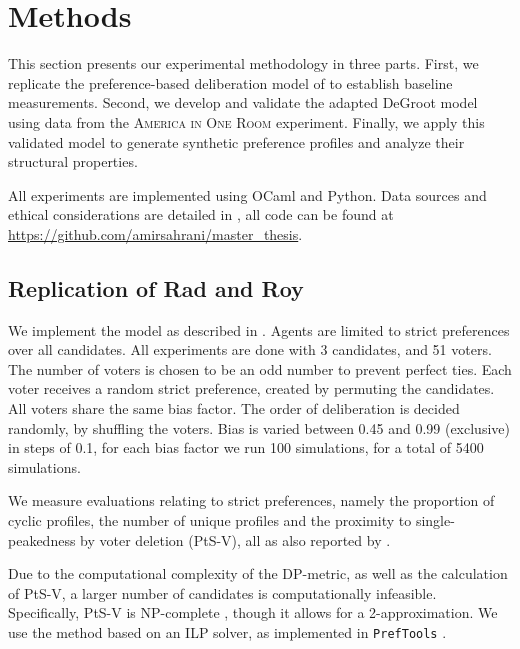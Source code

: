 \chapter{Methods}
\label{Methods}



This section presents our experimental methodology in three parts. First, we
replicate the preference-based deliberation model of
\citet{radDeliberationSinglePeakednessCoherent2021} to establish baseline
measurements. Second, we develop and validate the adapted DeGroot model using
data from the \textsc{America in One Room} experiment. Finally, we apply this validated
model to generate synthetic preference profiles and analyze their structural
properties.

All experiments are
implemented using OCaml and Python. Data sources and ethical considerations are
detailed in , all code can be found at \url{https://github.com/amirsahrani/master_thesis}.


\section{Replication of Rad and Roy}

We implement the model as described in . Agents are
limited to strict preferences over all candidates. All experiments are done with
3 candidates, and 51 voters. The number of voters is chosen to be an odd number
to prevent perfect ties. Each voter receives a random strict preference, created
by permuting the candidates. All voters share the same bias factor. The order of
deliberation is decided randomly, by shuffling the voters. Bias is varied
between 0.45 and 0.99 (exclusive) in steps of 0.1, for each bias factor we run 100
simulations, for a total of 5400 simulations.


We measure evaluations relating to strict preferences, namely the
proportion of cyclic profiles, the number of unique profiles and the proximity
to single-peakedness by voter deletion (PtS-V), all as also reported by
\citet{radDeliberationSinglePeakednessCoherent2021}.

Due to the computational complexity of the DP-metric, as well as the
calculation of PtS-V, a larger number of candidates is computationally
infeasible. Specifically, PtS-V is NP-complete
\cite{erdelyiComputationalAspectsNearly2013}, though it allows for a
2-approximation. We use the method based on an ILP solver, as implemented in
\texttt{PrefTools} \cite{PrefLibPreflibtools2025}.



